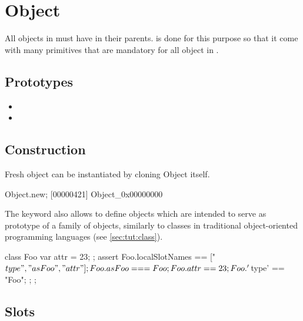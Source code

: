 \section{Object}

All objects in \us must have  in their
parents.  is done for this purpose so that it come
with many primitives that are mandatory for all object in \us.

\subsection{Prototypes}

\begin{itemize}
\item {}
\item {}
\end{itemize}

\subsection{Construction}

Fresh object can be instantiated by cloning Object itself.

\begin{urbiscript}
Object.new;
[00000421] Object_0x00000000
\end{urbiscript}

The keyword  also allows to define objects which are
intended to serve as prototype of a family of objects, similarly to
classes in traditional object-oriented programming languages (see
\autoref{sec:tut:class}).

\begin{urbiscript}[firstnumber=last]
{
  class Foo
  {
    var attr = 23;
  };
  assert
  {
    Foo.localSlotNames == ["$type", "asFoo", "attr"];
    Foo.asFoo === Foo;
    Foo.attr == 23;
    Foo.'$type' == "Foo";
  };
};
\end{urbiscript}


\subsection{Slots}

